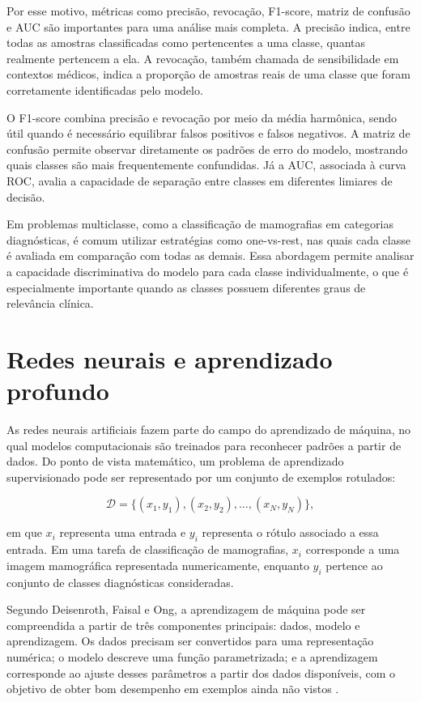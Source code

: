 \documentclass[
    12pt,
    openright,
    oneside,
    a4paper,
    english,
    brazil
]{abntex2}
\begin{document}
Por esse motivo, métricas como precisão, revocação, F1-score, matriz de confusão e AUC são importantes para uma análise mais completa. A precisão indica, entre todas as amostras classificadas como pertencentes a uma classe, quantas realmente pertencem a ela. A revocação, também chamada de sensibilidade em contextos médicos, indica a proporção de amostras reais de uma classe que foram corretamente identificadas pelo modelo.

O F1-score combina precisão e revocação por meio da média harmônica, sendo útil quando é necessário equilibrar falsos positivos e falsos negativos. A matriz de confusão permite observar diretamente os padrões de erro do modelo, mostrando quais classes são mais frequentemente confundidas. Já a AUC, associada à curva ROC, avalia a capacidade de separação entre classes em diferentes limiares de decisão.

Em problemas multiclasse, como a classificação de mamografias em categorias diagnósticas, é comum utilizar estratégias como one-vs-rest, nas quais cada classe é avaliada em comparação com todas as demais. Essa abordagem permite analisar a capacidade discriminativa do modelo para cada classe individualmente, o que é especialmente importante quando as classes possuem diferentes graus de relevância clínica.

\section{Redes neurais e aprendizado profundo}

As redes neurais artificiais fazem parte do campo do aprendizado de máquina, no qual modelos computacionais são treinados para reconhecer padrões a partir de dados. Do ponto de vista matemático, um problema de aprendizado supervisionado pode ser representado por um conjunto de exemplos rotulados:

\[
\mathcal{D} = \{(x_1,y_1),(x_2,y_2),\ldots,(x_N,y_N)\},
\]

em que \(x_i\) representa uma entrada e \(y_i\) representa o rótulo associado a essa entrada. Em uma tarefa de classificação de mamografias, \(x_i\) corresponde a uma imagem mamográfica representada numericamente, enquanto \(y_i\) pertence ao conjunto de classes diagnósticas consideradas.

Segundo Deisenroth, Faisal e Ong, a aprendizagem de máquina pode ser compreendida a partir de três componentes principais: dados, modelo e aprendizagem. Os dados precisam ser convertidos para uma representação numérica; o modelo descreve uma função parametrizada; e a aprendizagem corresponde ao ajuste desses parâmetros a partir dos dados disponíveis, com o objetivo de obter bom desempenho em exemplos ainda não vistos \cite{deisenroth2020mathematics}.
\end{document}
